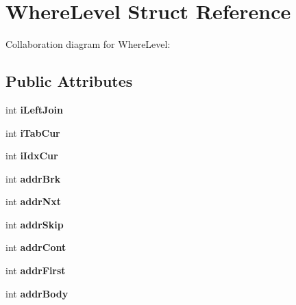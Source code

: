 \hypertarget{struct_where_level}{\section{Where\+Level Struct Reference}
\label{struct_where_level}
}


Collaboration diagram for Where\+Level\+:
\subsection*{Public Attributes}
\begin{DoxyCompactItemize}
\item 
\hypertarget{struct_where_level_a600072864f71c568cabcbb6140f6955a}{int {\bfseries i\+Left\+Join}}\label{struct_where_level_a600072864f71c568cabcbb6140f6955a}

\item 
\hypertarget{struct_where_level_aa31c27c3304de936a6ce974450c55592}{int {\bfseries i\+Tab\+Cur}}\label{struct_where_level_aa31c27c3304de936a6ce974450c55592}

\item 
\hypertarget{struct_where_level_a0733f34c7987c721351ab0001d4b1dd9}{int {\bfseries i\+Idx\+Cur}}\label{struct_where_level_a0733f34c7987c721351ab0001d4b1dd9}

\item 
\hypertarget{struct_where_level_a06f788bd4109f394d162250af9582e45}{int {\bfseries addr\+Brk}}\label{struct_where_level_a06f788bd4109f394d162250af9582e45}

\item 
\hypertarget{struct_where_level_ab4b748f1fa2ec727f00ca42d9df60144}{int {\bfseries addr\+Nxt}}\label{struct_where_level_ab4b748f1fa2ec727f00ca42d9df60144}

\item 
\hypertarget{struct_where_level_ae7fa600bc2de02c08095ae310e69e594}{int {\bfseries addr\+Skip}}\label{struct_where_level_ae7fa600bc2de02c08095ae310e69e594}

\item 
\hypertarget{struct_where_level_a493d44d8f3b53d4d47191d751f8a9a94}{int {\bfseries addr\+Cont}}\label{struct_where_level_a493d44d8f3b53d4d47191d751f8a9a94}

\item 
\hypertarget{struct_where_level_a2d87c8fb787ca4111d7ab38a838325a8}{int {\bfseries addr\+First}}\label{struct_where_level_a2d87c8fb787ca4111d7ab38a838325a8}

\item 
\hypertarget{struct_where_level_aa5e7bf3c8aa96edc0e65b7e669bfd49b}{int {\bfseries addr\+Body}}\label{struct_where_level_aa5e7bf3c8aa96edc0e65b7e669bfd49b}


\end{DoxyCompactItemize}
